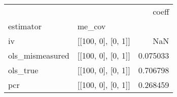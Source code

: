 \begin{tabular}{llr}
\toprule
    &                    &     coeff \\
estimator & me\_cov &           \\
\midrule
iv & [[100, 0], [0, 1]] &       NaN \\
ols\_mismeasured & [[100, 0], [0, 1]] &  0.075033 \\
ols\_true & [[100, 0], [0, 1]] &  0.706798 \\
pcr & [[100, 0], [0, 1]] &  0.268459 \\
\bottomrule
\end{tabular}
